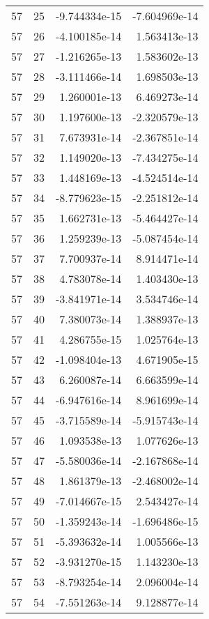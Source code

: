 \begin{tabular}{rrrr}
  57 &   25 & -9.744334e-15 & -7.604969e-14 \\
  57 &   26 & -4.100185e-14 &  1.563413e-13 \\
  57 &   27 & -1.216265e-13 &  1.583602e-13 \\
  57 &   28 & -3.111466e-14 &  1.698503e-13 \\
  57 &   29 &  1.260001e-13 &  6.469273e-14 \\
  57 &   30 &  1.197600e-13 & -2.320579e-13 \\
  57 &   31 &  7.673931e-14 & -2.367851e-14 \\
  57 &   32 &  1.149020e-13 & -7.434275e-14 \\
  57 &   33 &  1.448169e-13 & -4.524514e-14 \\
  57 &   34 & -8.779623e-15 & -2.251812e-14 \\
  57 &   35 &  1.662731e-13 & -5.464427e-14 \\
  57 &   36 &  1.259239e-13 & -5.087454e-14 \\
  57 &   37 &  7.700937e-14 &  8.914471e-14 \\
  57 &   38 &  4.783078e-14 &  1.403430e-13 \\
  57 &   39 & -3.841971e-14 &  3.534746e-14 \\
  57 &   40 &  7.380073e-14 &  1.388937e-13 \\
  57 &   41 &  4.286755e-15 &  1.025764e-13 \\
  57 &   42 & -1.098404e-13 &  4.671905e-15 \\
  57 &   43 &  6.260087e-14 &  6.663599e-14 \\
  57 &   44 & -6.947616e-14 &  8.961699e-14 \\
  57 &   45 & -3.715589e-14 & -5.915743e-14 \\
  57 &   46 &  1.093538e-13 &  1.077626e-13 \\
  57 &   47 & -5.580036e-14 & -2.167868e-14 \\
  57 &   48 &  1.861379e-13 & -2.468002e-14 \\
  57 &   49 & -7.014667e-15 &  2.543427e-14 \\
  57 &   50 & -1.359243e-14 & -1.696486e-15 \\
  57 &   51 & -5.393632e-14 &  1.005566e-13 \\
  57 &   52 & -3.931270e-15 &  1.143230e-13 \\
  57 &   53 & -8.793254e-14 &  2.096004e-14 \\
  57 &   54 & -7.551263e-14 &  9.128877e-14 \\

\end{tabular}
